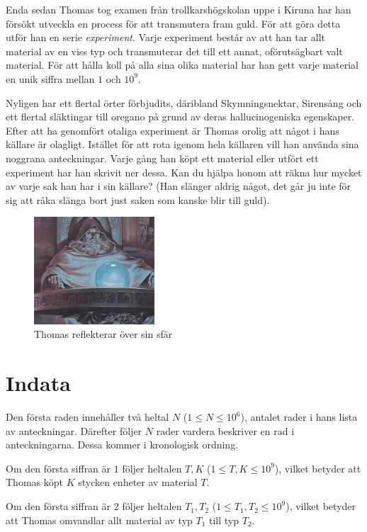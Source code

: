 Enda sedan Thomas tog examen från trollkarshögskolan uppe i Kiruna har han försökt utveckla en process för att transmutera fram guld. För att göra detta utför
han en serie \textit{experiment}. Varje experiment består av att han tar allt material av en viss typ och transmuterar det till ett annat, oförutsägbart valt
material. För att hålla koll på alla sina olika material har han gett varje material en unik siffra mellan $1$ och $10^9$. 

Nyligen har ett flertal örter förbjudits, däribland Skymningsnektar, Sirensång och ett flertal släktingar till oregano på grund av deras
hallucinogeniska egenskaper. Efter att ha genomfört otaliga experiment är Thomas orolig att något i hans källare är olagligt. Istället för att rota
igenom hela källaren vill han använda sina noggrana anteckningar. Varje gång han köpt ett material eller utfört ett experiment har han skrivit ner dessa.
Kan du hjälpa honom att räkna hur mycket av varje sak han har i sin källare? (Han slänger aldrig något, det går ju inte för sig att råka slänga bort
just saken som kanske blir till guld).

\begin{figure}
    \centering
        \includegraphics[width=0.4\textwidth]{thomas.jpg}
    \caption{Thomas reflekterar över sin sfär}
\end{figure}

\section*{Indata}
Den första raden innehåller två heltal $N$ ($1 \leq N \leq 10^6$), antalet rader i hans lista av anteckningar.
Därefter följer $N$ rader vardera beskriver en rad i anteckningarna. Dessa kommer i kronologisk ordning.

Om den första siffran är $1$ följer heltalen $T,K$ ($1 \leq T, K \leq 10^9$), vilket betyder att Thomas köpt $K$ stycken enheter av material $T$.

Om den första siffran är $2$ följer heltalen $T_1, T_2$ ($1 \leq T_1, T_2 \leq 10^9$), vilket betyder att Thomas omvandlar allt material av typ $T_1$ till typ $T_2$.


